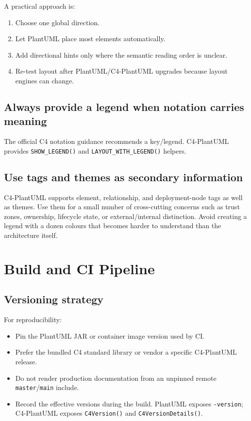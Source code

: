 \documentclass[11pt]{article}
\newcommand{\code}[1]{\texttt{#1}}
\begin{document}
A practical approach is:
\begin{enumerate}
  \item Choose one global direction.
  \item Let PlantUML place most elements automatically.
  \item Add directional hints only where the semantic reading order is unclear.
  \item Re-test layout after PlantUML/C4-PlantUML upgrades because layout engines can change.
\end{enumerate}

\subsection{Always provide a legend when notation carries meaning}

The official C4 notation guidance recommends a key/legend. C4-PlantUML provides \code{SHOW\_LEGEND()} and \code{LAYOUT\_WITH\_LEGEND()} helpers.\cite{c4notation,c4plantuml}

\subsection{Use tags and themes as secondary information}

C4-PlantUML supports element, relationship, and deployment-node tags as well as themes. Use them for a small number of cross-cutting concerns such as trust zones, ownership, lifecycle state, or external/internal distinction. Avoid creating a legend with a dozen colours that becomes harder to understand than the architecture itself.

\section{Build and CI Pipeline}

\subsection{Versioning strategy}

For reproducibility:
\begin{itemize}
  \item Pin the PlantUML JAR or container image version used by CI.
  \item Prefer the bundled C4 standard library or vendor a specific C4-PlantUML release.
  \item Do not render production documentation from an unpinned remote \code{master}/\code{main} include.
  \item Record the effective versions during the build. PlantUML exposes \code{-version}; C4-PlantUML exposes \code{C4Version()} and \code{C4VersionDetails()}.\cite{c4plantuml,plantumlversion}
\end{itemize}
\end{document}
